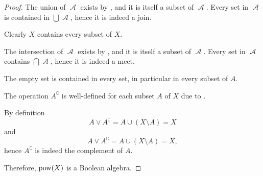 \begin{proof}
   The union of \( \mscrA \) exists by , and it is itself a subset of \( \mscrA \). Every set in \( \mscrA \) is contained in \( \bigcup \mscrA \), hence it is indeed a join.

   Clearly \( X \) contains every subset of \( X \).

   The intersection of \( \mscrA \) exists by , and it is itself a subset of \( \mscrA \). Every set in \( \mscrA \) contains \( \bigcap \mscrA \), hence it is indeed a meet.

   The empty set is contained in every set, in particular in every subset of \( A \).

   The operation \( A^\complement \) is well-defined for each subset \( A \) of \( X \) due to .

  By definition
  \begin{equation*}
    A \vee A^\complement
    =
    A \cup (X \setminus A)
    =
    X
  \end{equation*}
  and
  \begin{equation*}
    A \vee A^\complement
    =
    A \cup (X \setminus A)
    =
    X,
  \end{equation*}
  hence \( A^\complement \) is indeed the complement of \( A \).

  Therefore, \( \operatorname{pow}(X) \) is a Boolean algebra.
\end{proof}

